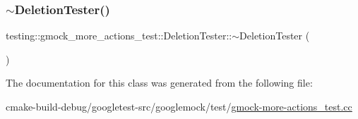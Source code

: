 \mbox{\label{classtesting_1_1gmock__more__actions__test_1_1DeletionTester_ac79602dcb18df1747b086d7118e7e5f7}} 
\subsubsection{\texorpdfstring{$\sim$DeletionTester()}{~DeletionTester()}}
{\footnotesize\ttfamily testing\+::gmock\+\_\+more\+\_\+actions\+\_\+test\+::\+Deletion\+Tester\+::$\sim$\+Deletion\+Tester (\begin{DoxyParamCaption}{ }\end{DoxyParamCaption})\hspace{0.3cm}{\ttfamily [inline]}}



The documentation for this class was generated from the following file\+:\begin{DoxyCompactItemize}
\item 
cmake-\/build-\/debug/googletest-\/src/googlemock/test/\mbox{\hyperlink{gmock-more-actions__test_8cc}{gmock-\/more-\/actions\+\_\+test.\+cc}}\end{DoxyCompactItemize}
